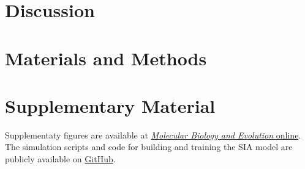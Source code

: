\section{Discussion}

\section{Materials and Methods} \label{methods}

\section{Supplementary Material}

Supplementaty figures are available at \href{https://academic.oup.com/mbe/article/39/1/msab332/6433161#supplementary-data}{\textit{Molecular Biology and Evolution} online}. The simulation scripts and code for building and training the SIA model are publicly available on \href{https://github.com/CshlSiepelLab/arg-selection}{GitHub}.